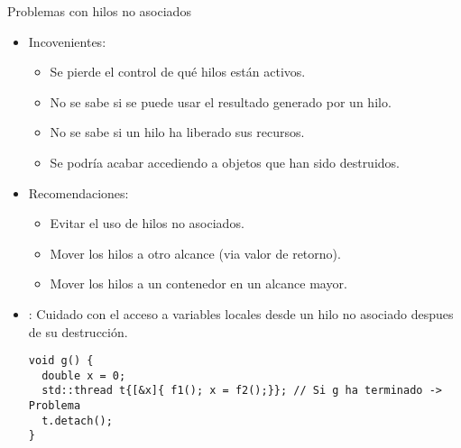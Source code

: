 \begin{frame}[t,fragile]{Problemas con hilos no asociados}
\begin{itemize}
  \item Incovenientes:
    \begin{itemize}
      \item Se pierde el control de qué hilos están activos.
      \item No se sabe si se puede usar el resultado generado por un hilo.
      \item No se sabe si un hilo ha liberado sus recursos.
      \item Se podría acabar accediendo a objetos que han sido destruidos.
    \end{itemize}
  \item Recomendaciones:
    \begin{itemize}
      \item Evitar el uso de hilos no asociados.
      \item Mover los hilos a otro alcance (via valor de retorno).
      \item Mover los hilos a un contenedor en un alcance mayor.
    \end{itemize}
  \item {}: Cuidado con el acceso a variables locales desde un hilo no asociado despues de su destrucción.
\begin{lstlisting}
void g() {
  double x = 0;
  std::thread t{[&x]{ f1(); x = f2();}}; // Si g ha terminado -> Problema
  t.detach();
}
\end{lstlisting}
\end{itemize}
\end{frame}

